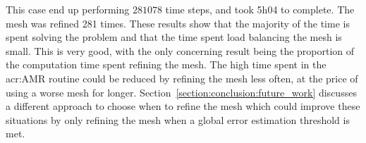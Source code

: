 This case end up performing \(281078\) time steps, and took 5h04 to complete. The mesh was refined
281 times. These results show that the majority of the time is spent solving the problem and that
the time spent load balancing the mesh is small. This is very good, with the only concerning result
being the proportion of the computation time spent refining the mesh. The high time spent in the
\acrshort{acr:AMR} routine could be reduced by refining the mesh less often, at the price of using a
worse mesh for longer. Section~\ref{section:conclusion:future_work} discusses a different approach
to choose when to refine the mesh which could improve these situations by only refining the mesh
when a global error estimation threshold is met.

